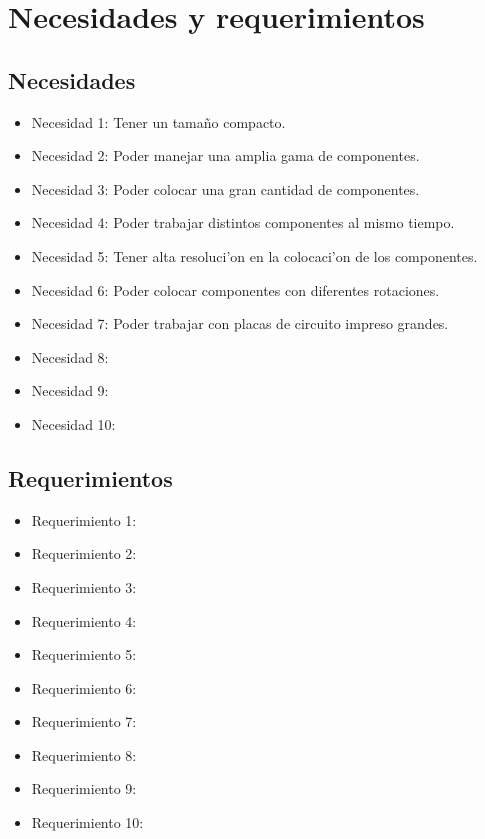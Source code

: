 \section{Necesidades y requerimientos}
\label{Necesidades_requerimientos}

\subsection{Necesidades}
\label{Necesidades}

\begin{itemize}
  \item Necesidad 1: Tener un tamaño compacto.
  \item Necesidad 2: Poder manejar una amplia gama de componentes.
  \item Necesidad 3: Poder colocar una gran cantidad de componentes.
  \item Necesidad 4: Poder trabajar distintos componentes al mismo tiempo.
  \item Necesidad 5: Tener alta resoluci'on en la colocaci'on de los componentes.
  \item Necesidad 6: Poder colocar componentes con diferentes rotaciones.
  \item Necesidad 7: Poder trabajar con placas de circuito  impreso grandes.
  \item Necesidad 8: 
  \item Necesidad 9: 
  \item Necesidad 10: 
\end{itemize}


\subsection{Requerimientos}
\label{Requerimientos}
 
\begin{itemize}
  \item Requerimiento 1: 
  \item Requerimiento 2: 
  \item Requerimiento 3: 
  \item Requerimiento 4: 
  \item Requerimiento 5: 
  \item Requerimiento 6: 
  \item Requerimiento 7: 
  \item Requerimiento 8: 
  \item Requerimiento 9: 
  \item Requerimiento 10: 
\end{itemize}


